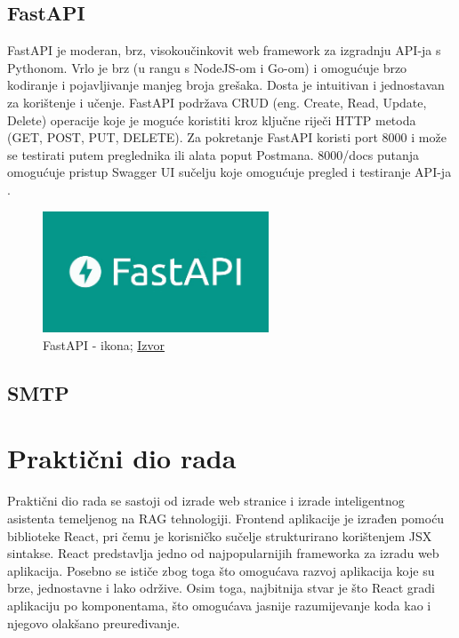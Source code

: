 \documentclass[]{foi}
\begin{document}
\section{FastAPI}
FastAPI je moderan, brz, visokoučinkovit web framework za izgradnju API-ja s Pythonom. Vrlo je brz (u rangu s NodeJS-om i Go-om) i
omogućuje brzo kodiranje i pojavljivanje manjeg broja grešaka. Dosta je intuitivan i jednostavan za korištenje i učenje. FastAPI podržava CRUD
(eng. Create, Read, Update, Delete) operacije koje je moguće koristiti kroz ključne riječi HTTP metoda (GET, POST, PUT, DELETE). Za pokretanje
FastAPI koristi port 8000 i može se testirati putem preglednika ili alata poput Postmana. 8000/docs putanja omogućuje pristup
Swagger UI sučelju koje omogućuje pregled i testiranje API-ja \cite{obafemi2025fastapi}. 

\begin{figure}[ht!]
    \centering
    \includegraphics[width=0.6\textwidth]{./assets/FastAPI.png} 
    \caption{FastAPI - ikona; \href{https://www.simplilearn.com/ice9/free_resources_article_thumb/FastAPI_b.jpg}{Izvor}}
    \label{fig:slika17}
\end{figure}

\section{SMTP}

\chapter{Praktični dio rada}
Praktični dio rada se sastoji od izrade web stranice i izrade inteligentnog asistenta temeljenog na RAG tehnologiji. Frontend aplikacije
je izrađen pomoću biblioteke React, pri čemu je korisničko sučelje strukturirano korištenjem JSX sintakse. React predstavlja jedno od najpopularnijih frameworka za izradu web aplikacija. Posebno se ističe zbog toga što omogućava
razvoj aplikacija koje su brze, jednostavne i lako održive. Osim toga, najbitnija stvar je što React gradi aplikaciju po komponentama, što omogućava
jasnije razumijevanje koda kao i njegovo olakšano preuređivanje.
\end{document}
